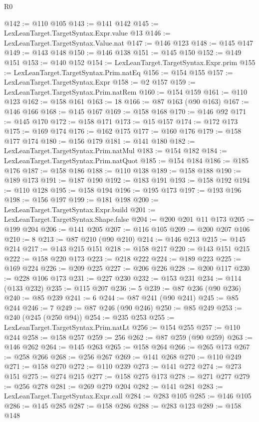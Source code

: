 \begin{lexlean}{R0}
\begin{coremodule}
@142 := @110 @105
@143 := @141 @142
@145 := LexLeanTarget.TargetSyntax.Expr.value @13
@146 := LexLeanTarget.TargetSyntax.Value.nat
@147 := @146 @123
@148 := @145 @147
@149 := @143 @148
@150 := @146 @138
@151 := @145 @150
@152 := @149 @151
@153 := @140 @152
@154 := LexLeanTarget.TargetSyntax.Expr.prim
@155 := LexLeanTarget.TargetSyntax.Prim.natEq
@156 := @154 @155
@157 := LexLeanTarget.TargetSyntax.Expr
@158 := @2 @157
@159 := LexLeanTarget.TargetSyntax.Prim.natRem
@160 := @154 @159
@161 := @110 @123
@162 := @158 @161
@163 := 18
@166 := @87 @163 (@90 @163)
@167 := @146 @166
@168 := @145 @167
@169 := @158 @168
@170 := @146 @92
@171 := @145 @170
@172 := @158 @171
@173 := @15 @157
@174 := @172 @173
@175 := @169 @174
@176 := @162 @175
@177 := @160 @176
@179 := @158 @177 @174
@180 := @156 @179
@181 := @141 @180
@182 := LexLeanTarget.TargetSyntax.Prim.natMul
@183 := @154 @182
@184 := LexLeanTarget.TargetSyntax.Prim.natQuot
@185 := @154 @184
@186 := @185 @176
@187 := @158 @186
@188 := @110 @138
@189 := @158 @188
@190 := @189 @173
@191 := @187 @190
@192 := @183 @191
@193 := @158 @192
@194 := @110 @128
@195 := @158 @194
@196 := @195 @173
@197 := @193 @196
@198 := @156 @197
@199 := @181 @198
@200 := LexLeanTarget.TargetSyntax.Expr.build
@201 := LexLeanTarget.TargetSyntax.Shape.false
@204 := @200 @201 @11 @173
@205 := @199 @204
@206 := @141 @205
@207 := @116 @105
@209 := @200 @207 @106
@210 := 8
@213 := @87 @210 (@90 @210)
@214 := @146 @213
@215 := @145 @214
@217 := @143 @215 @151
@218 := @158 @217
@220 := @143 @151 @215
@222 := @158 @220 @173
@223 := @218 @222
@224 := @189 @223
@225 := @169 @224
@226 := @209 @225
@227 := @206 @226
@228 := @200 @117
@230 := @228 @106 @173
@231 := @227 @230
@232 := @153 @231
@234 := @114 (@133 @232)
@235 := @115 @207
@236 := 5
@239 := @87 @236 (@90 @236)
@240 := @85 @239
@241 := 6
@244 := @87 @241 (@90 @241)
@245 := @85 @244
@246 := 7
@249 := @87 @246 (@90 @246)
@250 := @85 @249
@253 := @240 (@245 (@250 @94))
@254 := @235 @253
@255 := LexLeanTarget.TargetSyntax.Prim.natLt
@256 := @154 @255
@257 := @110 @244
@258 := @158 @257
@259 := 256
@262 := @87 @259 (@90 @259)
@263 := @146 @262
@264 := @145 @263
@265 := @158 @264
@266 := @265 @173
@267 := @258 @266
@268 := @256 @267
@269 := @141 @268
@270 := @110 @249
@271 := @158 @270
@272 := @110 @239
@273 := @141 @272
@274 := @273 @151
@275 := @274 @215
@277 := @158 @275 @173
@278 := @271 @277
@279 := @256 @278
@281 := @269 @279 @204
@282 := @141 @281
@283 := LexLeanTarget.TargetSyntax.Expr.call
@284 := @283 @105
@285 := @146 @105
@286 := @145 @285
@287 := @158 @286
@288 := @283 @123
@289 := @158 @148

\end{coremodule}
\end{lexlean}
